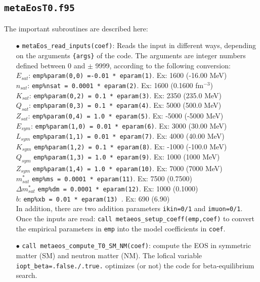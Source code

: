 \documentclass[11pt]{article}
\newcommand{\code}[1]{\colorbox{light-gray}{\mbox{\texttt{#1}}}}
\begin{document}
\subsection{\code{metaEosT0.f95}}

The important subroutines are described here:
\begin{enumerate}
\item[$\bullet$] \code{metaEos\_read\_inputs(coef)}: Reads the input in different ways, depending on the arguments  \code{\{args\}} of the code.
The arguments are integer numbers defined between 0 and $\pm$ 9999, according to the following conversion:\\
$E_{sat}$:  \code{emp\%param(0,0) =-0.01   * eparam(1)}. Ex: 1600 (-16.00 MeV)\\
$n_{sat}$:  \code{emp\%nsat       = 0.0001 * eparam(2)}. Ex: 1600 (0.1600 fm$^{-3}$)\\
$K_{sat}$:  \code{emp\%param(0,2) = 0.1    * eparam(3)}. Ex: 2350 (235.0 MeV)\\
$Q_{sat}$:  \code{emp\%param(0,3) = 0.1    * eparam(4)}. Ex: 5000 (500.0 MeV)\\
$Z_{sat}$:  \code{emp\%param(0,4) = 1.0    * eparam(5)}. Ex: -5000 (-5000 MeV)\\
$E_{sym}$:  \code{emp\%param(1,0) = 0.01   * eparam(6)}. Ex: 3000 (30.00 MeV)\\
$L_{sym}$  \code{emp\%param(1,1) = 0.01   * eparam(7)}. Ex: 4000 (40.00 MeV)\\
$K_{sym}$  \code{emp\%param(1,2) = 0.1    * eparam(8)}. Ex: -1000 (-100.0 MeV)\\
$Q_{sym}$  \code{emp\%param(1,3) = 1.0    * eparam(9)}. Ex: 1000 (1000 MeV)\\
$Z_{sym}$  \code{emp\%param(1,4) = 1.0    * eparam(10)}. Ex: 7000 (7000 MeV)\\
$m^*_{sat}$  \code{emp\%ms         = 0.0001 * eparam(11)}. Ex: 7500 (0.7500)\\
$\Delta m^*_{sat}$  \code{emp\%dm         = 0.0001 * eparam(12)}. Ex: 1000 (0.1000)\\
$b$:  \code{emp\%xb         = 0.01   * eparam(13) }. Ex: 690 (6.90)\\
In addition, there are two addition parameters \code{ikin=0/1} and \code{imuon=0/1}.\\
Once the inputs are read: \code{call metaeos\_setup\_coeff(emp,coef)} to convert the empirical parameters in \code{emp} into the model coefficients in \code{coef}.
\item[$\bullet$] \code{call metaeos\_compute\_T0\_SM\_NM(coef)}: compute the EOS in symmetric matter (SM) and neutron matter (NM). The lofical variable \code{iopt\_beta=.false./.true.} optimizes (or not) the code for beta-equilibrium search.

\end{enumerate}
\end{document}
